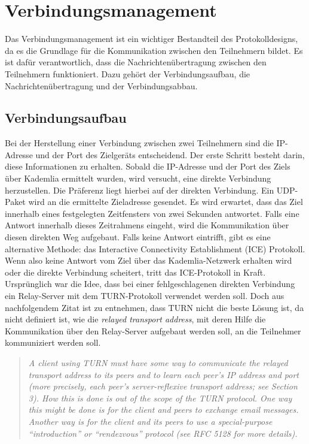 \section{Verbindungsmanagement}
\label{subsec:verbindungsmanagement}

Das Verbindungsmanagement ist ein wichtiger Bestandteil des Protokolldesigns, da es die Grundlage für die Kommunikation zwischen den Teilnehmern bildet. Es ist dafür verantwortlich, dass die Nachrichtenübertragung zwischen den Teilnehmern funktioniert. Dazu gehört der Verbindungsaufbau, die Nachrichtenübertragung und der Verbindungsabbau.

\subsection{Verbindungsaufbau}
\label{label:verbindungsaufbau}

Bei der Herstellung einer Verbindung zwischen zwei Teilnehmern sind die IP-Adresse und der Port des Zielgeräts entscheidend. Der erste Schritt besteht darin, diese Informationen zu erhalten. Sobald die IP-Adresse und der Port des Ziels über Kademlia ermittelt wurden, wird versucht, eine direkte Verbindung herzustellen. Die Präferenz liegt hierbei auf der direkten Verbindung. Ein UDP-Paket wird an die ermittelte Zieladresse gesendet. Es wird erwartet, dass das Ziel innerhalb eines festgelegten Zeitfensters von zwei Sekunden antwortet. Falls eine Antwort innerhalb dieses Zeitrahmens eingeht, wird die Kommunikation über diesen direkten Weg aufgebaut. Falls keine Antwort eintrifft, gibt es eine alternative Methode: das Interactive Connectivity Establishment (ICE) Protokoll. Wenn also keine Antwort vom Ziel über das Kademlia-Netzwerk erhalten wird oder die direkte Verbindung scheitert, tritt das ICE-Protokoll in Kraft.
Ursprünglich war die Idee, dass bei einer fehlgeschlagenen direkten Verbindung ein Relay-Server mit dem TURN-Protokoll verwendet werden soll. Doch aus nachfolgendem Zitat ist zu entnehmen, dass TURN nicht die beste Lösung ist, da nicht definiert ist, wie die \textit{relayed transport address}, mit deren Hilfe die Kommunikation über den Relay-Server aufgebaut werden soll, an die Teilnehmer kommuniziert werden soll.


\begin{quote}
    \textit{A client using TURN must have some way to communicate the relayed transport address to its
    peers and to learn each peer's IP address and port (more precisely, each peer's server-reflexive
    transport address; see Section 3). How this is done is out of the scope of the TURN protocol. One
    way this might be done is for the client and peers to exchange email messages. Another way is
    for the client and its peers to use a special-purpose \enquote{introduction} or \enquote{rendezvous} protocol (see RFC 5128
    for more details).} \parencite[S. 7]{rfc8656_TURN}
\end{quote}


